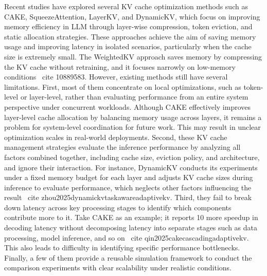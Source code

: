 \documentclass[sigconf,nonacm]{acmart}
\begin{document}
\par Recent studies have explored several KV cache optimization methods such as CAKE\cite{qin2025cakecascadingadaptivekv}, SqueezeAttention\cite{wang2024squeezeattention2dmanagementkvcache}, LayerKV\cite{xiong2024layerkvoptimizinglargelanguage}, and DynamicKV\cite{zhou2025dynamickvtaskawareadaptivekv}, which focus on improving memory efficiency in LLM through layer-wise compression, token eviction, and static allocation strategies. These approaches achieve the aim of saving memory usage and improving latency in isolated scenarios, particularly when the cache size is extremely small. The WeightedKV approach saves memory by compressing the KV cache without retraining, and it focuses narrowly on low-memory conditions \ cite {10889583}. However, existing methods still have several limitations. First, most of them concentrate on local optimizations, such as token-level or layer-level, rather than evaluating performance from an entire system perspective under concurrent workloads. Although CAKE effectively improves layer-level cache allocation by balancing memory usage across layers, it remains a problem for system-level coordination for future work\cite{qin2025cakecascadingadaptivekv}. This may result in unclear optimization scales in real-world deployments. Second, these KV cache management strategies evaluate the inference performance by analyzing all factors combined together, including cache size, eviction policy, and architecture, and ignore their interaction. For instance, DynamicKV conducts its experiments under a fixed memory budget for each layer and adjusts KV cache sizes during inference to evaluate performance, which neglects other factors influencing the result \ cite {zhou2025dynamickvtaskawareadaptivekv}. Third, they fail to break down latency across key processing stages to identify which components contribute more to it. Take CAKE as an example; it reports 10 more speedup in decoding latency without decomposing latency into separate stages such as data processing, model inference, and so on \ cite {qin2025cakecascadingadaptivekv}. This also leads to difficulty in identifying specific performance bottlenecks. Finally, a few of them provide a reusable simulation framework to conduct the comparison experiments with clear scalability under realistic conditions.
\end{document}
